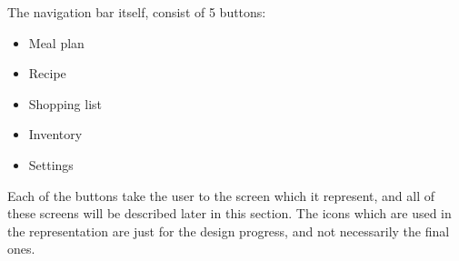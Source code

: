 The navigation bar itself, consist of 5 buttons:

\begin{itemize}
    \item Meal plan
    \item Recipe
    \item Shopping list
    \item Inventory
    \item Settings
\end{itemize}

Each of the buttons take the user to the screen which it represent, and all of these screens will be described later in this section. The icons which are used in the representation are just for the design progress, and not necessarily the final ones.






